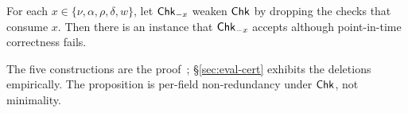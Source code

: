 \begin{proposition}
\label{prop:nonredundant}
 For each $x\in\{\nu,\alpha,\allowbreak\rho,\delta,w\}$, let $\mathsf{Chk}_{-x}$ weaken
$\mathsf{Chk}$ by
dropping the checks that consume $x$. Then there is an instance that
$\mathsf{Chk}_{-x}$ accepts although point-in-time correctness fails.
\end{proposition}

 The five constructions are the proof~\cite{asofgov-tr};
\S\ref{sec:eval-cert} exhibits the deletions empirically. The
proposition is per-field
non-redundancy under $\mathsf{Chk}$, not minimality.
